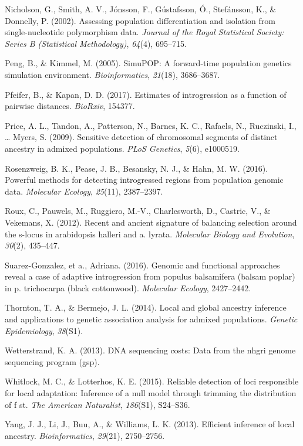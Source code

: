 \documentclass[12pt,twoside]{reedthesis}
\begin{document}
  \hypertarget{ref-nicholson2002assessing}{}
  Nicholson, G., Smith, A. V., Jónsson, F., Gústafsson, Ó., Stefánsson,
  K., \& Donnelly, P. (2002). Assessing population differentiation and
  isolation from single-nucleotide polymorphism data. \emph{Journal of the
  Royal Statistical Society: Series B (Statistical Methodology)},
  \emph{64}(4), 695--715.
  
  \hypertarget{ref-peng2005simupop}{}
  Peng, B., \& Kimmel, M. (2005). SimuPOP: A forward-time population
  genetics simulation environment. \emph{Bioinformatics}, \emph{21}(18),
  3686--3687.
  
  \hypertarget{ref-pfeifer2017estimates}{}
  Pfeifer, B., \& Kapan, D. D. (2017). Estimates of introgression as a
  function of pairwise distances. \emph{BioRxiv}, 154377.
  
  \hypertarget{ref-price2009sensitive}{}
  Price, A. L., Tandon, A., Patterson, N., Barnes, K. C., Rafaels, N.,
  Ruczinski, I., \ldots{} Myers, S. (2009). Sensitive detection of
  chromosomal segments of distinct ancestry in admixed populations.
  \emph{PLoS Genetics}, \emph{5}(6), e1000519.
  
  \hypertarget{ref-rosenzweig2016powerful}{}
  Rosenzweig, B. K., Pease, J. B., Besansky, N. J., \& Hahn, M. W. (2016).
  Powerful methods for detecting introgressed regions from population
  genomic data. \emph{Molecular Ecology}, \emph{25}(11), 2387--2397.
  
  \hypertarget{ref-roux2012recent}{}
  Roux, C., Pauwels, M., Ruggiero, M.-V., Charlesworth, D., Castric, V.,
  \& Vekemans, X. (2012). Recent and ancient signature of balancing
  selection around the s-locus in arabidopsis halleri and a. lyrata.
  \emph{Molecular Biology and Evolution}, \emph{30}(2), 435--447.
  
  \hypertarget{ref-suarez2016}{}
  Suarez-Gonzalez, et a., Adriana. (2016). Genomic and functional
  approaches reveal a case of adaptive introgression from populus
  balsamifera (balsam poplar) in p. trichocarpa (black cottonwood).
  \emph{Molecular Ecology}, 2427--2442.
  
  \hypertarget{ref-thornton2014local}{}
  Thornton, T. A., \& Bermejo, J. L. (2014). Local and global ancestry
  inference and applications to genetic association analysis for admixed
  populations. \emph{Genetic Epidemiology}, \emph{38}(S1).
  
  \hypertarget{ref-wetterstrand2013dna}{}
  Wetterstrand, K. A. (2013). DNA sequencing costs: Data from the nhgri
  genome sequencing program (gsp).
  
  \hypertarget{ref-whitlock2015reliable}{}
  Whitlock, M. C., \& Lotterhos, K. E. (2015). Reliable detection of loci
  responsible for local adaptation: Inference of a null model through
  trimming the distribution of f st. \emph{The American Naturalist},
  \emph{186}(S1), S24--S36.
  
  \hypertarget{ref-yang2013efficient}{}
  Yang, J. J., Li, J., Buu, A., \& Williams, L. K. (2013). Efficient
  inference of local ancestry. \emph{Bioinformatics}, \emph{29}(21),
  2750--2756.
  
\end{document}
